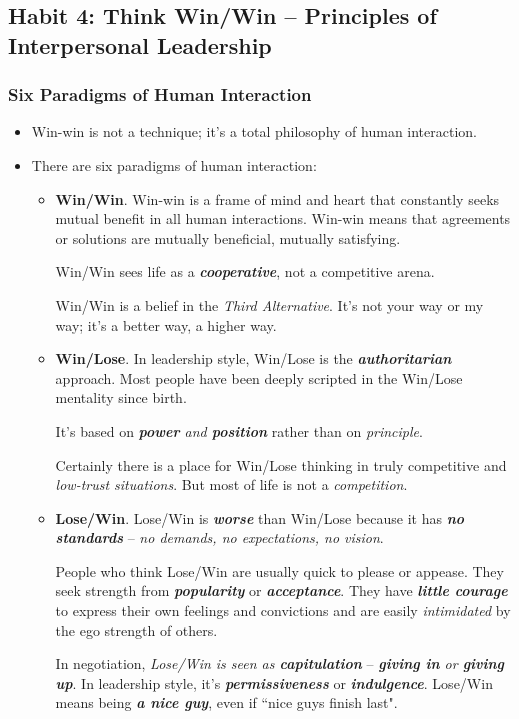 \documentclass[11pt]{article}
\begin{document}
\subsection{Habit 4: Think Win/Win -- Principles of Interpersonal Leadership}
\subsubsection{Six Paradigms of Human Interaction}
\begin{itemize}
\item Win-win is not a technique; it's a total philosophy of human interaction. 

\item There are six paradigms of human interaction:
\begin{itemize}
\item \textbf{Win/Win}. Win-win is a frame of mind and heart that constantly seeks mutual benefit in all human interactions. Win-win means that agreements or solutions are mutually beneficial, mutually satisfying. 

Win/Win sees life as a \emph{\textbf{cooperative}}, not a competitive arena. 

Win/Win is a belief in the \emph{Third Alternative}. It's not your way or my way; it's a better way, a higher way.

\item \textbf{Win/Lose}. In leadership style, Win/Lose is the \emph{\textbf{authoritarian}} approach. Most people have been deeply scripted in the Win/Lose mentality since birth.

It's based on \emph{\textbf{power} and \textbf{position}} rather than on \emph{principle}.

Certainly there is a place for Win/Lose thinking in truly competitive and \emph{low-trust situations}. But most of life is not a \emph{competition}.

\item \textbf{Lose/Win}. Lose/Win is \emph{\textbf{worse}} than Win/Lose because it has \emph{\textbf{no standards}} -- \emph{no demands, no expectations, no vision}. 

People who think Lose/Win are usually quick to please or appease. They seek strength from \emph{\textbf{popularity}} or \emph{\textbf{acceptance}}. They have \emph{\textbf{little courage}} to express their own feelings and convictions and are easily \emph{intimidated} by the ego strength of others.

In negotiation, \emph{Lose/Win is seen as \textbf{capitulation}} -- \emph{\textbf{giving in} or \textbf{giving up}}. In leadership style, it's \emph{\textbf{permissiveness}} or \emph{\textbf{indulgence}}. Lose/Win means being \emph{\textbf{a nice guy}}, even if ``nice guys finish last".


\end{itemize}
\end{itemize}
\end{document}
